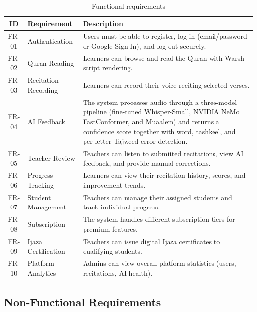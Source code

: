 \begin{table}[H]
  \centering
  \caption{Functional requirements}
  \label{tab:cs_func_req}
  \renewcommand{\arraystretch}{1.3}
  \begin{tabular}{clp{8cm}}
    \toprule
    \textbf{ID} & \textbf{Requirement} & \textbf{Description} \\
    \midrule
    FR-01 & Authentication & Users must be able to register, log in (email/password or Google Sign-In), and log out securely. \\
    FR-02 & Quran Reading & Learners can browse and read the Quran with Warsh script rendering. \\
    FR-03 & Recitation Recording & Learners can record their voice reciting selected verses. \\
    FR-04 & AI Feedback & The system processes audio through a three-model pipeline (fine-tuned Whisper-Small, NVIDIA NeMo FastConformer, and Muaalem) and returns a confidence score together with word, tashkeel, and per-letter Tajweed error detection. \\
    FR-05 & Teacher Review & Teachers can listen to submitted recitations, view AI feedback, and provide manual corrections. \\
    FR-06 & Progress Tracking & Learners can view their recitation history, scores, and improvement trends. \\
    FR-07 & Student Management & Teachers can manage their assigned students and track individual progress. \\
    FR-08 & Subscription & The system handles different subscription tiers for premium features. \\
    FR-09 & Ijaza Certification & Teachers can issue digital Ijaza certificates to qualifying students. \\
    FR-10 & Platform Analytics & Admins can view overall platform statistics (users, recitations, AI health). \\
    \bottomrule
  \end{tabular}
\end{table}

\subsection{Non-Functional Requirements}

